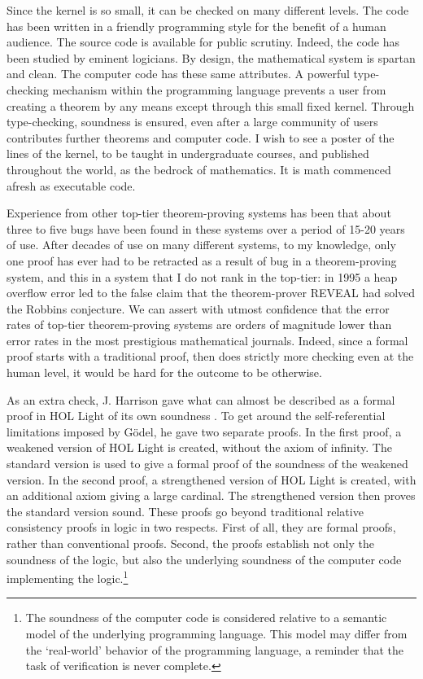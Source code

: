 \documentclass{llncs}
\begin{document}
Since the kernel is so small, it can be checked on many different levels.  The
code has been written in a friendly programming style for the benefit
of a human audience.  The source code is available for public scrutiny.   Indeed, the code
has been studied by eminent logicians.  
By design, the mathematical system is spartan
and clean.  The computer code has these same attributes.   A powerful type-checking mechanism within the programming language prevents a user from creating a theorem by any means except through this small fixed kernel.  Through type-checking, soundness is ensured, even after
a large community of users contributes further theorems and computer code. 
I wish to see a poster of the lines of the kernel, to be taught in undergraduate courses, and published throughout the world, as
the bedrock of mathematics.  It is math commenced afresh
as executable code.

Experience from other top-tier theorem-proving systems has been that about three to five bugs have been found
in these systems over a period of 15-20 years of use.  After decades of use on many different
systems, to my knowledge, only one proof
has ever had to be retracted as a result of bug in a theorem-proving system,
and this in a system that I do not rank in the top-tier:  in 1995
a heap overflow error led to the false claim that the theorem-prover REVEAL had solved the Robbins
conjecture. %
We can assert with utmost confidence that 
the error rates of top-tier theorem-proving systems are 
orders of magnitude lower than
error rates in the most prestigious mathematical journals.  Indeed, since a formal proof starts with
a traditional proof, then does strictly more checking even at the human level, 
it would be hard for the outcome to be otherwise.

As an extra check, J. Harrison gave what can almost be described as 
a formal proof in HOL Light of its own soundness \cite{HaSelf}.   To get around the self-referential limitations
imposed by G\"odel, he gave two separate proofs.  In the first proof, a weakened
version of HOL Light is created, without the axiom of infinity.  The standard version is
used to give a formal proof of the soundness of the weakened version.  In the second proof, a strengthened
version of HOL Light is created, with an additional axiom giving a large cardinal.  The strengthened
version then proves the standard version sound.  These proofs go beyond traditional relative consistency
proofs in logic in two respects.  First of all, they are formal proofs, rather than conventional proofs.
Second, the proofs establish not only the soundness of the logic, but also the underlying soundness
of the computer code implementing the logic.\footnote{The soundness of the computer code is considered
relative to a semantic model of the underlying programming language.  This model may differ from
the `real-world' behavior of the programming language, a reminder that the task of verification
is never complete.}
\end{document}
